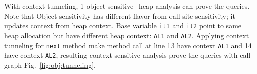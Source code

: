 With context tunneling, 1-object-sensitive+heap analysis can prove the queries. Note that Object sensitivity
has different flavor from call-site sensitivity; it updates context from heap context. Base
variable \texttt{it1} and \texttt{it2} point to same heap allocation but have different heap context: 
\texttt{AL1} and \texttt{AL2}. Applying context tunneling for \texttt{next} method make method call
at line 13 have context \texttt{AL1} and 14 have context \texttt{AL2},
resulting context sensitive analysis prove the queries with call-graph 
Fig.~\ref{fig:obj:tunneling}. 


